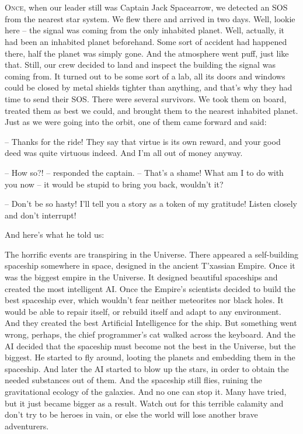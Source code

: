 \documentclass[ebook,twoside,final,openright]{memoir}
\begin{document}
\chapter{}
\par
\lettrine{O}{nce,} when our leader still was Captain Jack Spacearrow, we detected an SOS from the nearest star system. We flew there and arrived in two days. Well, lookie here – the signal was coming from the only inhabited planet. Well, actually, it had been an inhabited planet beforehand. Some sort of accident had happened there, half the planet was simply gone. And the atmosphere went puff, just like that. Still, our crew decided to land and inspect the building the signal was coming from. It turned out to be some sort of a lab, all its doors and windows could be closed by metal shields tighter than anything, and that's why they had time to send their SOS. There were several survivors. We took them on board, treated them as best we could, and brought them to the nearest inhabited planet. Just as we were going into the orbit, one of them came forward and said: \par
\par
– Thanks for the ride! They say that virtue is its own reward, and your good deed was quite virtuous indeed. And I’m all out of money anyway.\par
– How so?! – responded the captain. – That's a shame! What am I to do with you now – it would be stupid to bring you back, wouldn’t it? \par
– Don’t be so hasty! I'll tell you a story as a token of my gratitude! Listen closely and don’t interrupt! \par
 And here’s what he told us:\par
\par
The horrific events are transpiring in the Universe. There appeared a self-building spaceship somewhere in space, designed in the ancient T'xassian Empire. Once it was the biggest empire in the Universe. It designed beautiful spaceships and created the most intelligent AI. Once the Empire’s scientists decided to build the best spaceship ever, which wouldn’t fear neither meteorites nor black holes. It would be able to repair itself, or rebuild itself and adapt to any environment. And they created the best Artificial Intelligence for the ship. But something went wrong, perhaps, the chief programmer’s cat walked across the keyboard. And the AI decided that the spaceship must become not the best in the Universe, but the biggest. He started to fly around, looting the planets and embedding them in the spaceship. And later the AI started to blow up the stars, in order to obtain the needed substances out of them. And the spaceship still flies, ruining the gravitational ecology of the galaxies. And no one can stop it. Many have tried, but it just became bigger as a result. Watch out for this terrible calamity and don’t try to be heroes in vain, or else the world will lose another brave adventurers.\par
\end{document}
